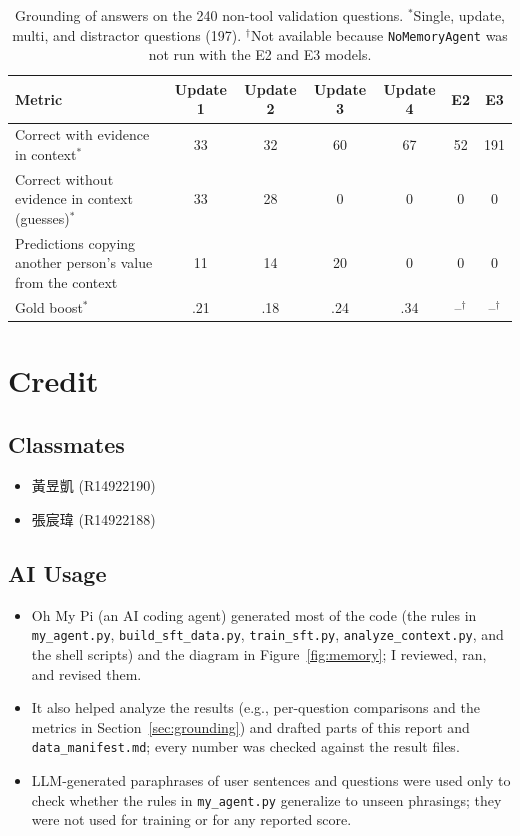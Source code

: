 \documentclass{article}
\begin{document}
\begin{table}[H]
    \centering
    \small
    \begin{tabular}{lcccccc}
        \toprule
        Metric & Update 1 & Update 2 & Update 3 & Update 4 & E2 & E3 \\
        \midrule
        Correct with evidence in context$^{*}$ & 33 & 32 & 60 & 67 & 52 & 191 \\
        Correct without evidence in context (guesses)$^{*}$ & 33 & 28 & 0 & 0 & 0 & 0 \\
        Predictions copying another person's value from the context & 11 & 14 & 20 & 0 & 0 & 0 \\
        Gold boost$^{*}$ & .21 & .18 & .24 & .34 & --$^{\dagger}$ & --$^{\dagger}$ \\
        \bottomrule
    \end{tabular}
    \caption{Grounding of answers on the 240 non-tool validation questions. $^{*}$Single, update, multi, and distractor questions (197). $^{\dagger}$Not available because \texttt{NoMemoryAgent} was not run with the E2 and E3 models.}
    \label{tab:grounding}
\end{table}

\section{Credit}
\subsection{Classmates}
\begin{itemize}
    \item 黃昱凱 (R14922190)
    \item 張宸瑋 (R14922188)
\end{itemize}
\subsection{AI Usage}
\begin{itemize}
    \item Oh My Pi (an AI coding agent) generated most of the code (the rules in \texttt{my\_agent.py}, \texttt{build\_sft\_data.py}, \texttt{train\_sft.py}, \texttt{analyze\_context.py}, and the shell scripts) and the diagram in Figure~\ref{fig:memory}; I reviewed, ran, and revised them.
    \item It also helped analyze the results (e.g., per-question comparisons and the metrics in Section~\ref{sec:grounding}) and drafted parts of this report and \texttt{data\_manifest.md}; every number was checked against the result files.
    \item LLM-generated paraphrases of user sentences and questions were used only to check whether the rules in \texttt{my\_agent.py} generalize to unseen phrasings; they were not used for training or for any reported score.
\end{itemize}
\end{document}

